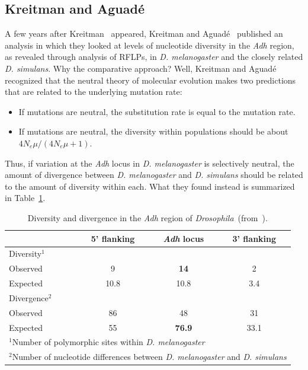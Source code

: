\documentclass[12pt]{article}
\begin{document}
\subsection*{Kreitman and Aguad{\'e}}

A few years after Kreitman~\cite{Kreitman83} appeared, Kreitman and
Aguad{\'e}~\cite{Kreitman-Aguade86} published an analysis in which
they looked at levels of nucleotide diversity in the {\it Adh\/}
region, as revealed through analysis of RFLPs, in {\it
  D. melanogaster\/} and the closely related {\it D. simulans}. Why
the comparative approach? Well, Kreitman and Aguad{\'e} recognized
that the neutral theory of molecular evolution makes two predictions
that are related to the underlying mutation rate:

\begin{itemize}

\item If mutations are neutral, the substitution rate is equal to the
  mutation rate.

\item If mutations are neutral, the diversity within populations
  should be about $4N_e\mu/(4N_e\mu + 1)$.

\end{itemize}

\noindent Thus, if variation at the {\it Adh\/} locus in {\it
  D. melanogaster\/} is selectively neutral, the amount of divergence
between {\it D. melanogaster\/} and {\it D. simulans\/} should be
related to the amount of diversity within each. What they found
instead is summarized in Table~\ref{table:ka}.

\begin{table}
\begin{center}
\begin{tabular}{l|ccc}
\hline\hline
         & 5' flanking & {\it Adh\/} locus & 3' flanking \\
\hline
Diversity$^1$ \\
\quad Observed & 9     & {\bf 14}   & 2    \\
\quad Expected & 10.8  & 10.8 & 3.4  \\
Divergence$^2$ \\
\quad Observed & 86    & 48   & 31   \\
\quad Expected & 55    & {\bf 76.9} & 33.1 \\
\hline
\multicolumn{4}{l}{$^1$Number of polymorphic sites within {\it
         D. melanogaster\/}} \\
\multicolumn{4}{l}{$^2$Number of nucleotide differences between {\it
         D. melanogaster\/} and {\it D. simulans}}
\end{tabular}
\end{center}
\caption{Diversity and divergence in the {\it Adh\/} region of {\it
    Drosophila}~(from~\cite{Kreitman-Aguade86}).}\label{table:ka}
\end{table}
\end{document}
